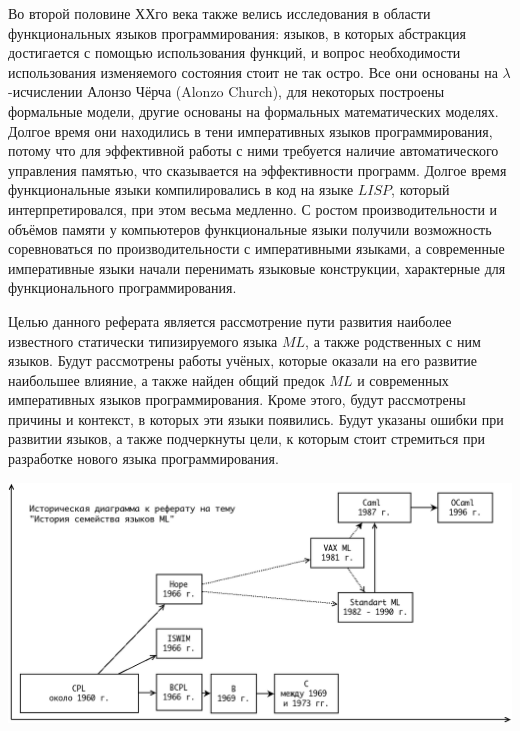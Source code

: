 \documentclass[14pt]{matmex-diploma-custom}
\begin{document}
Во второй половине ХХго века также велись исследования в области функциональных языков программирования: языков, в которых абстракция достигается с помощью использования функций, и вопрос необходимости использования изменяемого состояния стоит не так остро. Все они основаны на $\lambda$-исчислении Алонзо Чёрча (Alonzo Church), для некоторых построены формальные модели, другие основаны на формальных математических моделях. Долгое время они находились в тени императивных языков программирования, потому что для эффективной работы с ними требуется наличие автоматического управления памятью, что сказывается на эффективности программ. Долгое время функциональные языки компилировались в код на языке $LISP$, который интерпретировался, при этом весьма медленно. С ростом производительности и объёмов памяти у компьютеров функциональные языки получили возможность соревноваться по производительности с императивными языками, а современные императивные языки начали перенимать языковые конструкции, характерные для функционального программирования.

Целью данного реферата является рассмотрение пути развития наиболее известного статически типизируемого языка $M\!L$, а также родственных с ним языков. Будут рассмотрены работы учёных, которые оказали на его развитие наибольшее влияние, а также найден общий предок $M\!L$ и современных императивных языков программирования. Кроме этого, будут рассмотрены причины и контекст, в которых эти языки появились. Будут указаны ошибки при развитии языков, а также подчеркнуты цели, к которым стоит стремиться при разработке нового языка программирования.


\begin{center}
\includegraphics[angle=90,scale=0.585]{Diagram.png}
\end{center}
\end{document}
